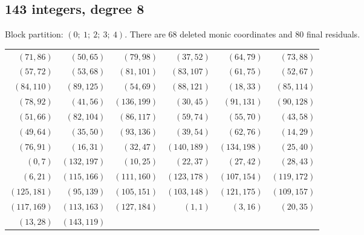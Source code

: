 \subsection{143 integers, degree 8}
Block partition: $(0;\ 1;\ 2;\ 3;\ 4)$.
There are 68 deleted monic coordinates and 80 final residuals.
\begin{center}\small\begin{tabular}{rrrrrr}\toprule
$(71,86)$ & $(50,65)$ & $(79,98)$ & $(37,52)$ & $(64,79)$ & $(73,88)$\\
$(57,72)$ & $(53,68)$ & $(81,101)$ & $(83,107)$ & $(61,75)$ & $(52,67)$\\
$(84,110)$ & $(89,125)$ & $(54,69)$ & $(88,121)$ & $(18,33)$ & $(85,114)$\\
$(78,92)$ & $(41,56)$ & $(136,199)$ & $(30,45)$ & $(91,131)$ & $(90,128)$\\
$(51,66)$ & $(82,104)$ & $(86,117)$ & $(59,74)$ & $(55,70)$ & $(43,58)$\\
$(49,64)$ & $(35,50)$ & $(93,136)$ & $(39,54)$ & $(62,76)$ & $(14,29)$\\
$(76,91)$ & $(16,31)$ & $(32,47)$ & $(140,189)$ & $(134,198)$ & $(25,40)$\\
$(0,7)$ & $(132,197)$ & $(10,25)$ & $(22,37)$ & $(27,42)$ & $(28,43)$\\
$(6,21)$ & $(115,166)$ & $(111,160)$ & $(123,178)$ & $(107,154)$ & $(119,172)$\\
$(125,181)$ & $(95,139)$ & $(105,151)$ & $(103,148)$ & $(121,175)$ & $(109,157)$\\
$(117,169)$ & $(113,163)$ & $(127,184)$ & $(1,1)$ & $(3,16)$ & $(20,35)$\\
$(13,28)$ & $(143,119)$ &  &  &  & \\
\bottomrule\end{tabular}\end{center}
